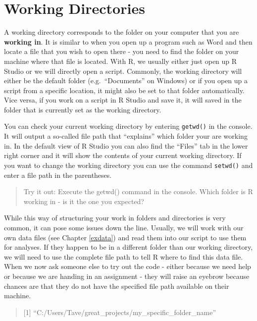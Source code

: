\documentclass[
]{book}
\begin{document}
\section{Working Directories}\label{working-directories}

A working directory corresponds to the folder on your computer that you are \textbf{working in}.
It is similar to when you open up a program such as Word and then locate a file that you wish to open there - you need to find the folder on your machine where that file is located.
With R, we usually either just open up R Studio or we will directly open a script.
Commonly, the working directory will either be the default folder (e.g.~``Documents'' on Windows) or if you open up a script from a specific location, it might also be set to that folder automatically.
Vice versa, if you work on a script in R Studio and save it, it will saved in the folder that is currently set as the working directory.

You can check your current working directory by entering \texttt{getwd()} in the console.
It will output a so-called file path that ``explains'' which folder your are working in.
In the default view of R Studio you can also find the ``Files'' tab in the lower right corner and it will show the contents of your current working directory.
If you want to change the working directory you can use the command \texttt{setwd()} and enter a file path in the parentheses.

\begin{quote}
Try it out: Execute the getwd() command in the console.
Which folder is R working in - is it the one you expected?
\end{quote}

While this way of structuring your work in folders and directories is very common, it can pose some issues down the line.
Usually, we will work with our own data files (see Chapter \ref{exdata}) and read them into our script to use them for analyses.
If they happen to be in a different folder than our working directory, we will need to use the complete file path to tell R where to find this data file.
When we now ask someone else to try out the code - either because we need help or because we are handing in an assignment - they will raise an eyebrow because chances are that they do not have the specified file path available on their machine.

\begin{quote}
{[}1{]} ``C:/Users/Tave/great\_projects/my\_specific\_folder\_name''
\end{quote}
\end{document}
